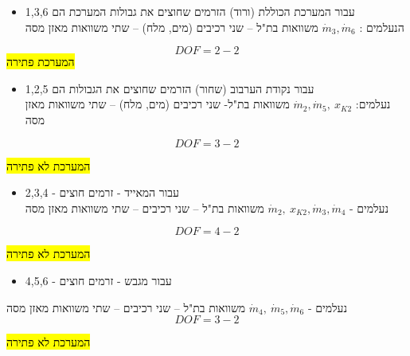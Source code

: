 \documentclass[
  hebrew,
  letterpaper,
  DIV=11,
  numbers=noendperiod]{scrreprt}
\providecommand{\tightlist}{%
  \setlength{\itemsep}{0pt}\setlength{\parskip}{0pt}}
\begin{document}
\begin{tcolorbox}[enhanced jigsaw, colback=white, arc=.35mm, coltitle=black, breakable, toptitle=1mm, leftrule=.75mm, colbacktitle=quarto-callout-note-color!10!white, opacitybacktitle=0.6, bottomtitle=1mm, titlerule=0mm, opacityback=0, colframe=quarto-callout-note-color-frame, title=\textcolor{quarto-callout-note-color}{\faInfo}\hspace{0.5em}{ניתוח דרגות חופש}, rightrule=.15mm, bottomrule=.15mm, toprule=.15mm, left=2mm]

\begin{itemize}
\tightlist
\item
  עבור המערכת הכוללת (ורוד) הזרמים שחוצים את גבולות המערכת הם 1,3,6\\
  הנעלמים : \({\dot{m}}_{3},{\dot{m}}_{6}\) משוואות בת"ל -- שני רכיבים
  (מים, מלח) -- שתי משוואות מאזן מסה
\end{itemize}

\[DOF = 2 - 2\] \hl{המערכת פתירה}

\begin{itemize}
\tightlist
\item
  עבור נקודת הערבוב (שחור) הזרמים שחוצים את הגבולות הם 1,2,5\\
  נעלמים: \({\dot{m}}_{2},{\dot{m}}_{5},\ x_{K2}\) משוואות בת"ל- שני
  רכיבים (מים, מלח) -- שתי משוואות מאזן מסה
\end{itemize}

\[DOF = 3 - 2\]

\hl{המערכת לא פתירה}\\

\begin{itemize}
\tightlist
\item
  עבור המאייד - זרמים חוצים - 2,3,4\\
  נעלמים - \({\dot{m}}_{2},\ x_{K2},{\dot{m}}_{3},{\dot{m}}_{4}\)
  משוואות בת"ל -- שני רכיבים -- שתי משוואות מאזן מסה
\end{itemize}

\[DOF = 4 - 2\]

\hl{המערכת לא פתירה}

\begin{itemize}
\tightlist
\item
  עבור מגבש - זרמים חוצים - 4,5,6
\end{itemize}

נעלמים - \({\dot{m}}_{4},\ {\dot{m}}_{5},{\dot{m}}_{6}\) משוואות בת"ל --
שני רכיבים -- שתי משוואות מאזן מסה\\
\[DOF = 3 - 2\]

\hl{המערכת לא פתירה}\\

\end{tcolorbox}
\end{document}
